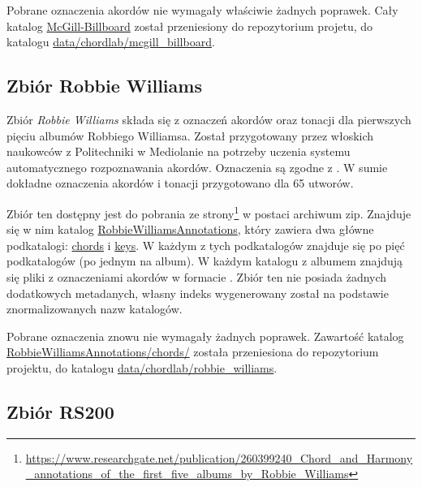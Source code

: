 Pobrane oznaczenia akordów nie wymagały właściwie żadnych poprawek. Cały katalog
\url{McGill-Billboard} został przeniesiony do repozytorium projetu, do katalogu
\url{data/chordlab/mcgill_billboard}.

\subsection{Zbiór Robbie Williams}

Zbiór \emph{Robbie Williams} \cite{giorgi_automatic_2013} składa się z oznaczeń akordów oraz tonacji
dla pierwszych pięciu albumów Robbiego Williamsa. Został przygotowany przez włoskich naukowców z
Politechniki w Mediolanie na potrzeby uczenia systemu automatycznego rozpoznawania akordów.
Oznaczenia są zgodne z \cite{harte_towards_nodate}. W sumie dokładne oznaczenia akordów i tonacji
przygotowano dla 65 utworów.

Zbiór ten dostępny jest do pobrania ze strony\footnote{\url{https://www.researchgate.net/publication/260399240_Chord_and_Harmony_annotations_of_the_first_five_albums_by_Robbie_Williams}}
w postaci archiwum zip. Znajduje się w nim katalog \url{RobbieWilliamsAnnotations}, który zawiera
dwa główne podkatalogi: \url{chords} i \url{keys}. W każdym z tych podkatalogów znajduje się po pięć
podkatalogów (po jednym na album). W każdym katalogu z albumem znajdują się pliki  z
oznaczeniami akordów w formacie . Zbiór ten nie posiada żadnych dodatkowych metadanych,
własny indeks wygenerowany został na podstawie znormalizowanych nazw katalogów.

Pobrane oznaczenia znowu nie wymagały żadnych poprawek. Zawartość katalog
\url{RobbieWilliamsAnnotations/chords/} została przeniesiona do repozytorium projektu, do katalogu
\url{data/chordlab/robbie_williams}.

\subsection{Zbiór RS200}

